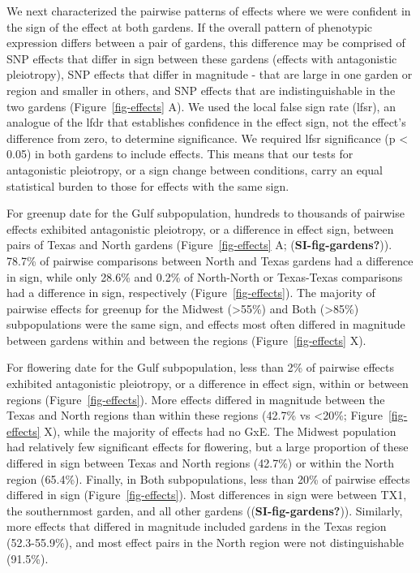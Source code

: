 \documentclass[
  9pt,
  twocolumn,
  twoside]{pnas-new}
\begin{document}
We next characterized the pairwise patterns of effects where we were
confident in the sign of the effect at both gardens. If the overall
pattern of phenotypic expression differs between a pair of gardens, this
difference may be comprised of SNP effects that differ in sign between
these gardens (effects with antagonistic pleiotropy), SNP effects that
differ in magnitude - that are large in one garden or region and smaller
in others, and SNP effects that are indistinguishable in the two gardens
(Figure~\ref{fig-effects} A). We used the local false sign rate (lfsr),
an analogue of the lfdr that establishes confidence in the effect sign,
not the effect's difference from zero, to determine significance. We
required lfsr significance (p \textless{} 0.05) in both gardens to
include effects. This means that our tests for antagonistic pleiotropy,
or a sign change between conditions, carry an equal statistical burden
to those for effects with the same sign.

For greenup date for the Gulf subpopulation, hundreds to thousands of
pairwise effects exhibited antagonistic pleiotropy, or a difference in
effect sign, between pairs of Texas and North gardens
(Figure~\ref{fig-effects} A; (\textbf{SI-fig-gardens?})). 78.7\% of
pairwise comparisons between North and Texas gardens had a difference in
sign, while only 28.6\% and 0.2\% of North-North or Texas-Texas
comparisons had a difference in sign, respectively
(Figure~\ref{fig-effects}). The majority of pairwise effects for greenup
for the Midwest (\textgreater55\%) and Both (\textgreater85\%)
subpopulations were the same sign, and effects most often differed in
magnitude between gardens within and between the regions
(Figure~\ref{fig-effects} X).

For flowering date for the Gulf subpopulation, less than 2\% of pairwise
effects exhibited antagonistic pleiotropy, or a difference in effect
sign, within or between regions (Figure~\ref{fig-effects}). More effects
differed in magnitude between the Texas and North regions than within
these regions (42.7\% vs \textless20\%; Figure~\ref{fig-effects} X),
while the majority of effects had no GxE. The Midwest population had
relatively few significant effects for flowering, but a large proportion
of these differed in sign between Texas and North regions (42.7\%) or
within the North region (65.4\%). Finally, in Both subpopulations, less
than 20\% of pairwise effects differed in sign
(Figure~\ref{fig-effects}). Most differences in sign were between TX1,
the southernmost garden, and all other gardens
((\textbf{SI-fig-gardens?})). Similarly, more effects that differed in
magnitude included gardens in the Texas region (52.3-55.9\%), and most
effect pairs in the North region were not distinguishable (91.5\%).
\end{document}

